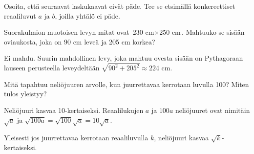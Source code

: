 \begin{tehtavasivu}
\begin{tehtava}
Osoita, että seuraavat laskukaavat eivät päde. Tee se etsimällä konkereettiset reaaliluvut $a$ ja $b$, joilla yhtälö ei päde.
        \begin{alakohdat}
        \end{alakohdat}
        
        \begin{vastaus}
        \begin{alakohdatrivi}
        \end{alakohdatrivi}
        \end{vastaus}
\end{tehtava}

\begin{tehtava}
        Suorakulmion muotoisen levyn mitat ovat $\text{230 cm} \times \text{250 cm}$. Mahtuuko se sisään oviaukosta, joka on 90 cm leveä ja 205 cm korkea?
       
        \begin{vastaus}
        Ei mahdu. Suurin mahdollinen levy, joka mahtuu ovesta sisään on Pythagoraan lauseen perusteella leveydeltään $\sqrt{90^2+205^2}\approx 224$ cm.
        \end{vastaus}
\end{tehtava}

\begin{tehtava}
        Mitä tapahtuu neliöjuuren arvolle, kun juurrettavaa kerrotaan luvulla 100? Miten tulos yleistyy?
       
        \begin{vastaus}
        Neliöjuuri kasvaa 10-kertaiseksi. Reaalilukujen $a$ ja $100a$ neliöjuuret ovat nimitäin $\sqrt{a}$ ja $\sqrt{100a}=\sqrt{100}\sqrt{a}=10\sqrt{a}$.
        
        Yleisesti jos juurrettavaa kerrotaan reaaliluvulla $k$, neliöjuuri kasvaa $\sqrt{k}$-kertaiseksi.
        \end{vastaus}
\end{tehtava}


\end{tehtavasivu}
